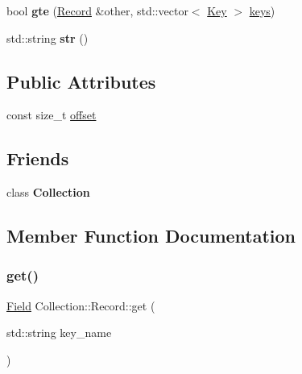 \begin{DoxyCompactItemize}
\item 
\mbox{\label{class_collection_1_1_record_a27aca1d2127efc59562ffd47e381249e}} 
bool {\bfseries gte} (\hyperlink{class_collection_1_1_record}{Record} \&other, std\+::vector$<$ \hyperlink{struct_key}{Key} $>$ \hyperlink{class_collection_aebff0d78673dac8453ebf51ba32d10eb}{keys})
\item 
\mbox{\label{class_collection_1_1_record_affc0e1f2bc3d8d5e92338f186fc2d1f7}} 
std\+::string {\bfseries str} ()
\end{DoxyCompactItemize}
\subsection*{Public Attributes}
\begin{DoxyCompactItemize}
\item 
const size\+\_\+t \hyperlink{class_collection_1_1_record_aabb05802a9c94e791df47bd7d8bda096}{offset}
\end{DoxyCompactItemize}
\subsection*{Friends}
\begin{DoxyCompactItemize}
\item 
\mbox{\label{class_collection_1_1_record_a6e332922765a19fc2a9593a20f26fc95}} 
class {\bfseries Collection}
\end{DoxyCompactItemize}


\subsection{Member Function Documentation}
\mbox{\label{class_collection_1_1_record_ac045539ed42788b33b56c0c60b4bede4}} 
\subsubsection{\texorpdfstring{get()}{get()}\hspace{0.1cm}{\footnotesize\ttfamily [1/2]}}
{\footnotesize\ttfamily \hyperlink{struct_field}{Field} Collection\+::\+Record\+::get (\begin{DoxyParamCaption}\item[{std\+::string}]{key\+\_\+name }\end{DoxyParamCaption})}

